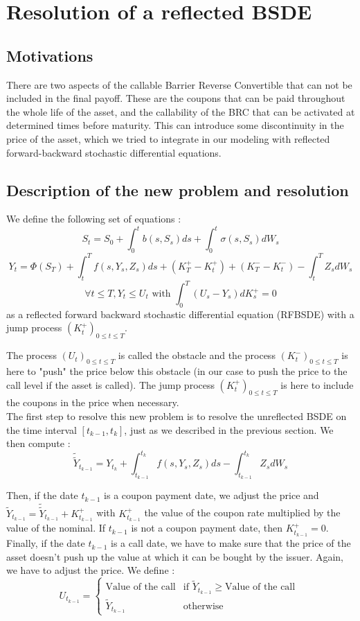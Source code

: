 \documentclass[a4paper,11pt,english]{book}
\begin{document}
\section{Resolution of a reflected BSDE}
\subsection{Motivations}
There are two aspects of the callable Barrier Reverse Convertible that can not be included in the final payoff. These are the coupons that can be paid throughout the whole life of the asset, and the callability of the BRC that can be activated at determined times before maturity. This can introduce some discontinuity in the price of the asset, which we tried to integrate in our modeling with reflected forward-backward stochastic differential equations.
\subsection{Description of the new problem and resolution}
We define the following set of equations :
$$S_{t}=S_{0} + \int_{0}^{t}b(s,S_{s})ds + \int_{0}^{t}\sigma(s,S_{s})dW_{s}$$
$$Y_{t}=\Phi(S_{T})+\int_{t}^{T}f(s,Y_{s},Z_{s})ds+(K_{T}^{+}-K_{t}^{+})+(K_{T}^{-}-K_{t}^{-})-\int_{t}^{T}Z_{s}dW_{s}$$
$$\forall t\leq T, Y_{t}\leq U_{t} \text{ with } \int_{0}^{T}(U_{s}-Y_{s})dK_{s}^{+}=0 $$
as a reflected forward backward stochastic differential equation (RFBSDE) with a jump process $(K_{t}^{+})_{0\leq t \leq T}$.

The process $(U_{t})_{0\leq t \leq T}$ is called the obstacle and the process $(K_{t}^{-})_{0\leq t \leq T}$ is here to "push" the price below this obstacle (in our case to push the price to the call level if the asset is called). The jump process $(K_{t}^{+})_{0\leq t \leq T}$ is here to include the coupons in the price when necessary. \\

The first step to resolve this new problem is to resolve the unreflected BSDE on the time interval $[t_{k-1},t_{k}]$, just as we described in the previous section. We then compute : $$\widetilde{\widetilde{Y}}_{t_{k-1}}=Y_{t_{k}}+\int_{t_{k-1}}^{t_{k}}f(s,Y_{s},Z_{s})ds-\int_{t_{k-1}}^{t_{k}}Z_{s}dW_{s}$$

Then, if the date $t_{k-1}$ is a coupon payment date, we adjust the price and $\widetilde{Y}_{t_{k-1}}= \widetilde{\widetilde{Y}}_{t_{k-1}} + K_{t_{k-1}}^{+}$ with $K_{t_{k-1}}^{+}$ the value of the coupon rate multiplied by the value of the nominal. If $t_{k-1}$ is not a coupon payment date, then $K_{t_{k-1}}^{+}=0$. \\
Finally, if the date $t_{k-1}$ is a call date, we have to make sure that the price of the asset doesn't push up the value at which it can be bought by the issuer. Again, we have to adjust the price. We define :
$$U_{t_{k-1}}=
\begin{cases}
\text{Value of the call} & \text{if } \widetilde{Y}_{t_{k-1}}\geq \text{Value of the call }\\
\widetilde{Y}_{t_{k-1}}& \text{otherwise }
\end{cases}$$
\end{document}
